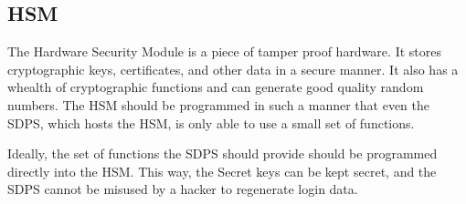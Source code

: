 \subsection{HSM}
The Hardware Security Module is a piece of tamper proof hardware.
It stores cryptographic keys, certificates, and other data in a secure manner.
It also has a whealth of cryptographic functions and can generate good quality random numbers.
The HSM should be programmed in such a manner that even the SDPS, which hosts the HSM, is only able to use a small set of functions.
\par
Ideally, the set of functions the SDPS should provide should be programmed directly into the HSM.
This way, the Secret keys can be kept secret, and the SDPS cannot be misused by a hacker to regenerate login data.
